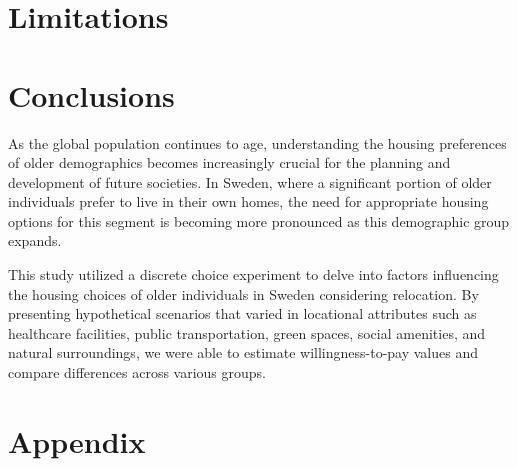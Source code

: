 \documentclass[3p,11pt ]{elsarticle}
\begin{document}
\section{Limitations}



\section{Conclusions}

As the global population continues to age, understanding the housing preferences of older demographics becomes increasingly crucial for the planning and development of future societies.
In Sweden, where a significant portion of older individuals prefer to live in their own homes, the need for appropriate housing options for this segment is becoming more pronounced as this demographic group expands. 

This study utilized a discrete choice experiment to delve into factors influencing the housing choices of older individuals in Sweden considering relocation.
By presenting hypothetical scenarios that varied in locational attributes such as healthcare facilities, public transportation, green spaces, social amenities, and natural surroundings, we were able to estimate willingness-to-pay values and compare differences across various groups.

%



\newpage
\clearpage

\section{Appendix}
\end{document}

